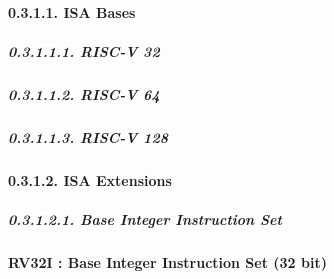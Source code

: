 \documentclass[
]{article}
\begin{document}
\hypertarget{isa-bases-3}{%
\paragraph{0.3.1.1. ISA Bases}\label{isa-bases-3}}

\hypertarget{risc-v-32-1}{%
\subparagraph{0.3.1.1.1. RISC-V 32}\label{risc-v-32-1}}

\hypertarget{risc-v-64-1}{%
\subparagraph{0.3.1.1.2. RISC-V 64}\label{risc-v-64-1}}

\hypertarget{risc-v-128-1}{%
\subparagraph{0.3.1.1.3. RISC-V 128}\label{risc-v-128-1}}

\hypertarget{isa-extensions-3}{%
\paragraph{0.3.1.2. ISA Extensions}\label{isa-extensions-3}}

\hypertarget{base-integer-instruction-set-1}{%
\subparagraph{0.3.1.2.1. Base Integer Instruction
Set}\label{base-integer-instruction-set-1}}

\textbf{RV32I : Base Integer Instruction Set (32 bit)}
\end{document}
